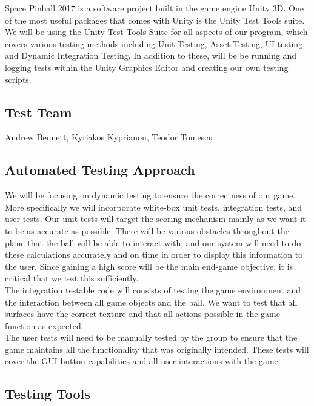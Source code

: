 \documentclass[12pt, titlepage]{article}
\begin{document}
Space Pinball 2017 is a software project built in the game engine Unity 3D. One of the most useful packages that comes with Unity is the Unity Test Tools suite. We will be using the Unity Test Tools Suite for all aspects of our program, which covers various testing methods including Unit Testing, Asset Testing, UI testing, and Dynamic Integration Testing. In addition to these, will be be running and logging tests within the Unity Graphics Editor and creating our own testing scripts.


\subsection{Test Team}

Andrew Bennett, Kyriakos Kyprianou, Teodor Tomescu

\subsection{Automated Testing Approach}


We will be focusing on dynamic testing to ensure the correctness of our game. More specifically we will incorporate white-box unit tests, integration tests, and user tests. Our unit tests will target the scoring mechanism mainly as we want it to be as accurate as possible. There will be various obstacles throughout the plane that the ball will be able to interact with, and our system will need to do these calculations accurately and on time in order to display this information to the user. Since gaining a high score will be the main end-game objective, it is critical that we test this sufficiently. \\

The integration testable code will consists of testing the game environment and the interaction between all game objects and the ball. We want to test that all surfaces have the correct texture and that all actions possible in the game function as expected.\\

The user tests will need to be manually tested by the group to ensure that the game maintains all the functionality that was originally intended. These tests will cover the GUI button capabilities and all user interactions with the game. 


\subsection{Testing Tools}
\end{document}
